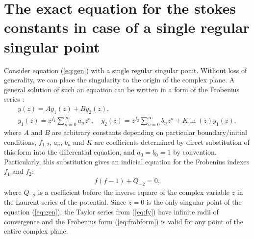 \documentclass[asy]{iosart2x}
\newcommand\eref[1]{(\ref{#1})}
\begin{document}
\section{The exact equation for the stokes constants in case of a single regular singular point \label{sec:frob}}
Consider equation \eref{eq:gen} with a single regular singular point. Without loss of generality,
we can place the singularity to the origin of the complex plane. A general solution of such an equation 
can be written in a form of the Frobenius series \cite{cbbook}:
\begin{subequations}
\label{eq:frobform}
\begin{eqnarray}
y(z) = A y_1(z)+B y_2(z), \label{eq:fgensol}
\\
y_1(z) = z^{f_1}\sum_{n=0}^{\infty}{a_n z^n},
\quad
y_2(z) = z^{f_2}\sum_{n=0}^{\infty}{b_n z^n} + K \ln(z) y_1(z), \label{eq:fy}
\end{eqnarray}
\end{subequations}
where $A$ and $B$ are arbitrary constants depending on particular boundary/initial conditions,  
$f_{1,2}$, $a_n$, $b_n$ and $K$ are coefficients determined by direct substitution of this form into the 
differential equation, and $a_0=b_0=1$ by convention. Particularly, this substitution gives
an indicial equation for the Frobenius indexes $f_1$ and $f_2$:
\begin{eqnarray}
f(f-1)+Q_{-2}=0,   \label{eq:indicial}
\end{eqnarray}
where $Q_{-2}$ is a coefficient before the inverse square of the complex variable $z$ in the Laurent series
of the potential. Since $z=0$ is the only singular point of the equation \eref{eq:gen}, the Taylor 
series from \eref{eq:fy} have infinite radii of convergence and the
Frobenius form \eref{eq:frobform} is valid for any point of the entire complex plane.
\end{document}
